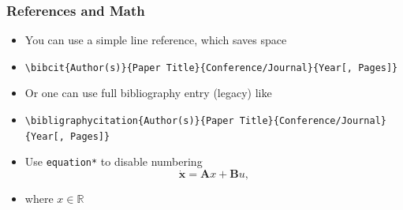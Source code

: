 \begin{frame}
    \frametitle{References and Math}
    
    \begin{itemize}
        \item You can use a simple line reference, which saves space
        \item {\footnotesize \tt \textbackslash bibcit\{Author(s)\}\{Paper Title\}\{Conference/Journal\}\{Year[, Pages]\}}
    \end{itemize}
    
    \vspace{0.5em}
    \begin{itemize}
        \item Or one can use full bibliography entry (legacy) like
        \item {\footnotesize \tt \textbackslash bibligraphycitation\{Author(s)\}\{Paper Title\}\{Conference/Journal\}\{Year[, Pages]\}}
    \end{itemize}
    \vspace{1em}
    \begin{itemize}
        \item Use {\tt equation*} to disable numbering
        \begin{equation*}
            \dot{\mathbf{x}} = \mathbf{A}x + \mathbf{B}u,
        \end{equation*}
        \item where $x \in \mathbb{R}$
    \end{itemize}
    
    
\end{frame}


